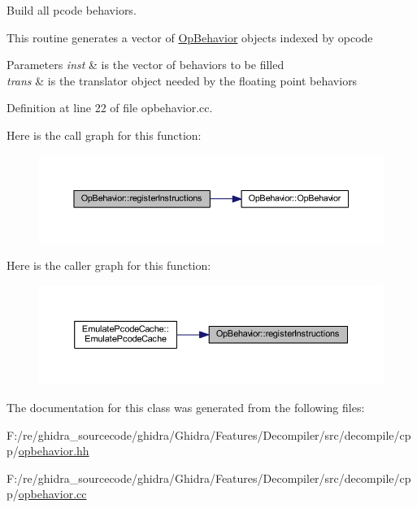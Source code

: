 Build all pcode behaviors. 

This routine generates a vector of \mbox{\hyperlink{class_op_behavior}{Op\+Behavior}} objects indexed by opcode 
\begin{DoxyParams}{Parameters}
{\em inst} & is the vector of behaviors to be filled \\
\hline
{\em trans} & is the translator object needed by the floating point behaviors \\
\hline
\end{DoxyParams}


Definition at line 22 of file opbehavior.\+cc.

Here is the call graph for this function\+:
\nopagebreak
\begin{figure}[H]
\begin{center}
\leavevmode
\includegraphics[width=350pt]{class_op_behavior_a652a4c9fa1b57d594e1c48d296d6b4e0_cgraph}
\end{center}
\end{figure}
Here is the caller graph for this function\+:
\nopagebreak
\begin{figure}[H]
\begin{center}
\leavevmode
\includegraphics[width=350pt]{class_op_behavior_a652a4c9fa1b57d594e1c48d296d6b4e0_icgraph}
\end{center}
\end{figure}


The documentation for this class was generated from the following files\+:\begin{DoxyCompactItemize}
\item 
F\+:/re/ghidra\+\_\+sourcecode/ghidra/\+Ghidra/\+Features/\+Decompiler/src/decompile/cpp/\mbox{\hyperlink{opbehavior_8hh}{opbehavior.\+hh}}\item 
F\+:/re/ghidra\+\_\+sourcecode/ghidra/\+Ghidra/\+Features/\+Decompiler/src/decompile/cpp/\mbox{\hyperlink{opbehavior_8cc}{opbehavior.\+cc}}\end{DoxyCompactItemize}
